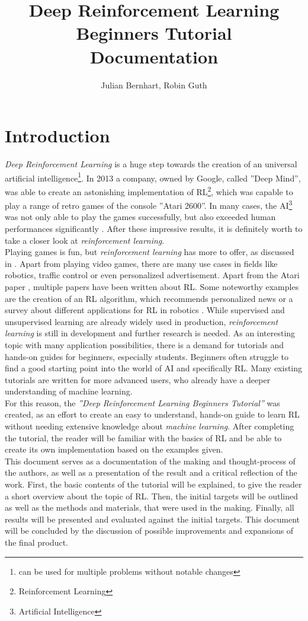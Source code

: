 \documentclass[10pt,a4paper]{article}
\title{Deep Reinforcement Learning Beginners Tutorial \\Documentation}
\author{Julian Bernhart, Robin Guth}
\begin{document}
	
	\maketitle
	\tableofcontents
	
	\section{Introduction}
	\textit{Deep Reinforcement Learning} is a huge step towards the creation of an universal artificial intelligence\footnote{can be used for multiple problems without notable changes}.
	In 2013 a company, owned by Google, called ''Deep Mind'', was able to create an astonishing implementation of RL\footnote{Reinforcement Learning}, which was capable to play a range of retro games of the console ''Atari 2600''.
	In many cases, the AI\footnote{Artificial Intelligence} was not only able to play the games successfully, but also exceeded human performances significantly \cite{atari}.
	After these impressive results, it is definitely worth to take a closer look at \textit{reinforcement learning}.\\	  
	Playing games is fun, but \textit{reinforcement learning} has more to offer, as discussed in \cite{usecasesRL}.
	Apart from playing video games, there are many use cases in fields like robotics, traffic control or even personalized advertisement.
	Apart from the Atari paper \cite{atari}, multiple papers have been written about RL.
	Some noteworthy examples are the creation of an RL algorithm, which recommends personalized news \cite{drn} or a survey about different applications for RL in robotics \cite{roboticsRL}. While supervised and unsupervised learning are already widely used in production, \textit{reinforcement learning} is still in development and further research is needed.
	As an interesting topic with many application possibilities, there is a demand for tutorials and hands-on guides for beginners, especially students.
	Beginners often struggle to find a good starting point into the world of AI and specifically RL.
	Many existing tutorials are written for more advanced users, who already have a deeper understanding of machine learning.\\
	For this reason, the \textit{''Deep Reinforcement Learning Beginners Tutorial''} was created, as an effort to create an easy to understand, hands-on guide to learn RL without needing extensive knowledge about \textit{machine learning}.
	After completing the tutorial, the reader will be familiar with the basics of RL and be able to create its own implementation based on the examples given.\\
	This document serves as a documentation of the making and thought-process of the authors, as well as a presentation of the result and a critical reflection of the work.
	First, the basic contents of the tutorial will be explained, to give the reader a short overview about the topic of RL.
	Then, the initial targets will be outlined as well as the methods and materials, that were used in the making.
	Finally, all results will be presented and evaluated against the initial targets. 
	This document will be concluded by the discussion of possible improvements and expansions of the final product.
		 
\end{document}
